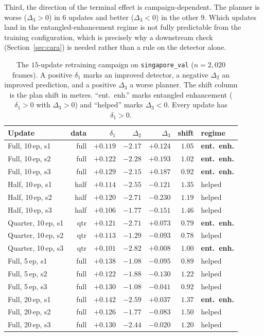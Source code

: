 \documentclass[conference]{IEEEtran}
\begin{document}
Third, the direction of the terminal effect is campaign-dependent. The
planner is worse ($\Delta_3 > 0$) in $6$ updates and better ($\Delta_3 < 0$) in
the other $9$. Which updates land in the entangled-enhancement
regime is not fully predictable from the training configuration, which is
precisely why a downstream check (Section~\ref{sec:cara}) is needed rather than a
rule on the detector alone.

\begin{table}[htbp]
\caption{The $15$-update retraining campaign on \texttt{singapore\_val}
($n=2{,}020$ frames). A positive $\delta_1$ marks an improved detector, a negative
$\Delta_2$ an improved prediction, and a positive $\Delta_3$ a worse planner. The
shift column is the plan shift in metres. ``ent.\ enh.'' marks entangled
enhancement ($\delta_1>0$ with $\Delta_3>0$) and ``helped'' marks $\Delta_3<0$.
Every update has $\delta_1>0$.}
\label{tab:campaign}
\centering
\renewcommand{\arraystretch}{1.15}
\setlength{\tabcolsep}{3.5pt}
\footnotesize
\begin{tabular}{@{}lrrrrrl@{}}
\toprule
\textbf{Update} & \textbf{data} & \textbf{$\delta_1$} & \textbf{$\Delta_2$} & \textbf{$\Delta_3$} & \textbf{shift} & \textbf{regime} \\
\midrule
Full, 10\,ep, s1     & full & $+0.119$ & $-2.17$ & $+0.124$ & $1.05$ & \textbf{ent.\ enh.} \\
Full, 10\,ep, s2     & full & $+0.122$ & $-2.28$ & $+0.193$ & $1.02$ & \textbf{ent.\ enh.} \\
Full, 10\,ep, s3     & full & $+0.129$ & $-2.15$ & $+0.187$ & $0.92$ & \textbf{ent.\ enh.} \\
Half, 10\,ep, s1     & half & $+0.114$ & $-2.55$ & $-0.121$ & $1.35$ & helped \\
Half, 10\,ep, s2     & half & $+0.120$ & $-2.71$ & $-0.230$ & $1.19$ & helped \\
Half, 10\,ep, s3     & half & $+0.106$ & $-1.77$ & $-0.151$ & $1.46$ & helped \\
Quarter, 10\,ep, s1  & qtr  & $+0.121$ & $-2.71$ & $+0.073$ & $0.79$ & \textbf{ent.\ enh.} \\
Quarter, 10\,ep, s2  & qtr  & $+0.113$ & $-1.29$ & $-0.093$ & $0.78$ & helped \\
Quarter, 10\,ep, s3  & qtr  & $+0.101$ & $-2.82$ & $+0.008$ & $1.00$ & \textbf{ent.\ enh.} \\
Full, 5\,ep, s1      & full & $+0.138$ & $-1.08$ & $-0.095$ & $0.89$ & helped \\
Full, 5\,ep, s2      & full & $+0.122$ & $-1.88$ & $-0.130$ & $1.22$ & helped \\
Full, 5\,ep, s3      & full & $+0.130$ & $-1.08$ & $-0.041$ & $0.92$ & helped \\
Full, 20\,ep, s1     & full & $+0.142$ & $-2.59$ & $+0.037$ & $1.37$ & \textbf{ent.\ enh.} \\
Full, 20\,ep, s2     & full & $+0.126$ & $-1.77$ & $-0.083$ & $1.50$ & helped \\
Full, 20\,ep, s3     & full & $+0.130$ & $-2.44$ & $-0.020$ & $1.20$ & helped \\
\bottomrule
\end{tabular}
\end{table}
\end{document}
